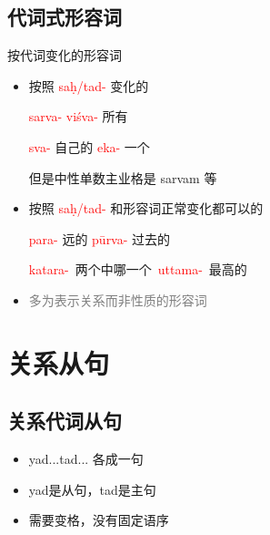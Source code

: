 \documentclass[17pt]{beamer}
\newcommand{\nounstem}[1]{\textcolor{red}{#1\nobreakdash-}}
\newcommand{\fullpada}[1]{\textcolor{OliveGreen}{#1}}
\newcommand{\notsoimportant}[1]{\textcolor{gray}{#1}}
\begin{document}
\subsection{代词式形容词}
\begin{frame}{按代词变化的形容词}
  \begin{itemize}
    \item 按照 \nounstem{saḥ/tad} 变化的
    
    \nounstem{sarva} \nounstem{viśva} 所有 
    
    \nounstem{sva} 自己的 \nounstem{eka} 一个
    
    但是中性单数主业格是 \fullpada{sarvam} 等
    \item 按照 \nounstem{saḥ/tad} 和形容词正常变化都可以的

    \nounstem{para} 远的 \nounstem{pūrva} 过去的

    \mbox{\nounstem{katara} 两个中哪一个 \nounstem{uttama} 最高的}
    \item \notsoimportant{多为表示关系而非性质的形容词}
  \end{itemize}
\end{frame}

\section{关系从句}
\begin{frame}{\insertsection }
    \small
    \tableofcontents[currentsection]
\end{frame}

\subsection{关系代词从句}
\begin{frame}{\insertsubsection }
  \begin{itemize}
    \item yad...tad... 各成一句
    \item yad是从句，tad是主句
    \item 需要变格，没有固定语序
  \end{itemize}
\end{frame}
\end{document}

